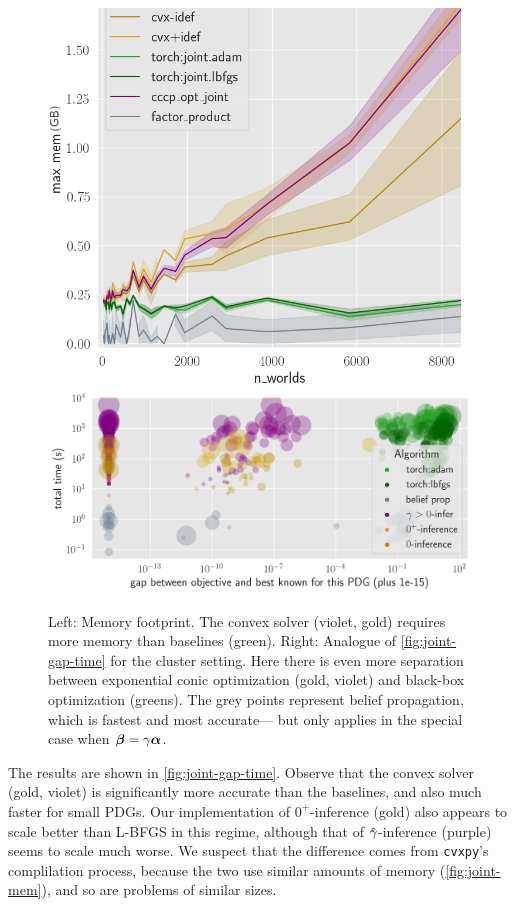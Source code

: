 \begin{figure}
    \centering
    \includegraphics[width=0.34\linewidth]{figs/rand-joint/mem-costs.png}
    \includegraphics[width=0.65\linewidth]{figs/rand-clus/gap-vs-time-agg9.png}
    \caption[Comparison of convex solver and black-box optimization baselines. Memory footprints, and accuracy/time costs for the cluster setting.]
    {%
    Left: Memory footprint.
    The convex solver (violet, gold)
     requires more memory than baselines (green).
    Right: Analogue of \cref{fig:joint-gap-time} for the cluster setting.
     Here there is even more separation between exponential conic optimization
         (gold, violet) and black-box optimization (greens).
     The grey points represent belief propagation, which is fastest and most accurate---%
         but only applies in the special case when $\boldsymbol\beta=\gamma\boldsymbol\alpha$.}
    \label{fig:joint-mem}
    \label{fig:clus-gap-vs-time}
\end{figure}


The results are shown in \cref{fig:joint-gap-time}.
Observe that the convex solver (gold, violet) is significantly more accurate than the baselines,
and also much faster for small PDGs.
Our implementation of $0^+\!$-inference (gold) also appears to scale better than L-BFGS
    in this regime, although
    that of $\zogamma$-inference (purple) seems to scale much worse. 
We suspect that the difference comes from \verb|cvxpy|'s complilation process,
    because the two use similar amounts of memory (\cref{fig:joint-mem}),
    and so are problems of similar sizes.



